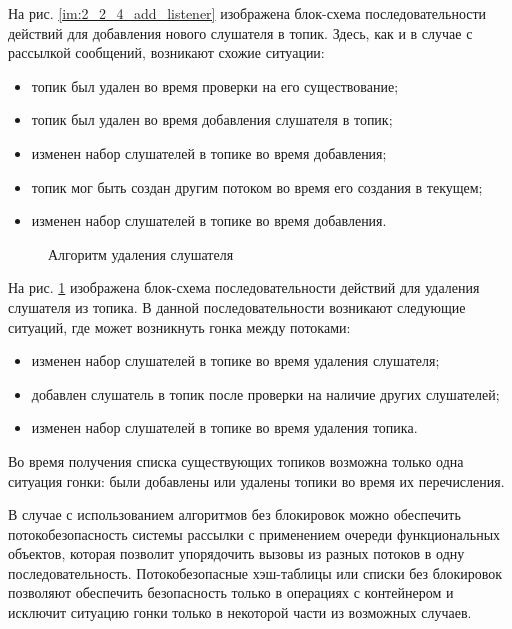 На рис. \ref{im:2_2_4_add_listener} изображена блок-схема последовательности действий для добавления нового слушателя в топик. Здесь, как и в случае с рассылкой сообщений, возникают схожие ситуации:

\begin{itemize}  
	\item топик был удален во время проверки на его существование;
	\item топик был удален во время добавления слушателя в топик;
	\item изменен набор слушателей в топике во время добавления;
	\item топик мог быть создан другим потоком во время его создания в текущем;
	\item изменен набор слушателей в топике во время добавления.
\end{itemize}

\begin{figure}[h]
	\caption{Алгоритм удаления слушателя}
	\label{im:2_2_6_remove_listener}
\end{figure}

На рис. \ref{im:2_2_6_remove_listener} изображена блок-схема последовательности действий для удаления слушателя из топика. В данной последовательности возникают следующие ситуаций, где может возникнуть гонка между потоками:

\begin{itemize}
	\item изменен набор слушателей в топике во время удаления слушателя;
	\item добавлен слушатель в топик после проверки на наличие других слушателей;
	\item изменен набор слушателей в топике во время удаления топика.
\end{itemize}

Во время получения списка существующих топиков возможна только одна ситуация гонки: были добавлены или удалены топики во время их перечисления.

В случае с использованием алгоритмов без блокировок можно обеспечить 
потокобезопасность системы рассылки с применением очереди функциональных 
объектов, которая позволит упорядочить вызовы из разных потоков в одну 
последовательность. Потокобезопасные хэш-таблицы или списки без блокировок 
позволяют обеспечить безопасность только в операциях с контейнером и исключит 
ситуацию гонки только в некоторой части из возможных случаев. 

